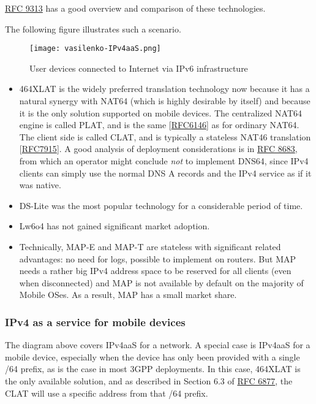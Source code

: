 \documentclass[
]{article}
\begin{document}
\href{https://www.rfc-editor.org/info/rfc9313}{RFC 9313} has a good
overview and comparison of these technologies.

The following figure illustrates such a scenario.

\begin{figure}
\centering
\texttt{[image: vasilenko-IPv4aaS.png]}
\caption{User devices connected to Internet via IPv6 infrastructure}
\end{figure}

\begin{itemize}
\item
  464XLAT is the widely preferred translation technology now because it
  has a natural synergy with NAT64 (which is highly desirable by itself)
  and because it is the only solution supported on mobile devices. The
  centralized NAT64 engine is called PLAT, and is the same
  {[}\href{https://www.rfc-editor.org/info/rfc6146}{RFC6146}{]} as for
  ordinary NAT64. The client side is called CLAT, and is typically a
  stateless NAT46 translation
  {[}\href{https://www.rfc-editor.org/info/rfc7915}{RFC7915}{]}. A good
  analysis of deployment considerations is in
  \href{https://www.rfc-editor.org/info/rfc8683}{RFC 8683}, from which
  an operator might conclude \emph{not} to implement DNS64, since IPv4
  clients can simply use the normal DNS A records and the IPv4 service
  as if it was native.
\item
  DS-Lite was the most popular technology for a considerable period of
  time.
\item
  Lw6o4 has not gained significant market adoption.
\item
  Technically, MAP-E and MAP-T are stateless with significant related
  advantages: no need for logs, possible to implement on routers. But
  MAP needs a rather big IPv4 address space to be reserved for all
  clients (even when disconnected) and MAP is not available by default
  on the majority of Mobile OSes. As a result, MAP has a small market
  share.
\end{itemize}

\subsubsection{IPv4 as a service for mobile
devices}\label{ipv4-as-a-service-for-mobile-devices}

The diagram above covers IPv4aaS for a network. A special case is
IPv4aaS for a mobile device, especially when the device has only been
provided with a single /64 prefix, as is the case in most 3GPP
deployments. In this case, 464XLAT is the only available solution, and
as described in Section 6.3 of
\href{https://www.rfc-editor.org/info/rfc6877}{RFC 6877}, the CLAT will
use a specific address from that /64 prefix.
\end{document}
